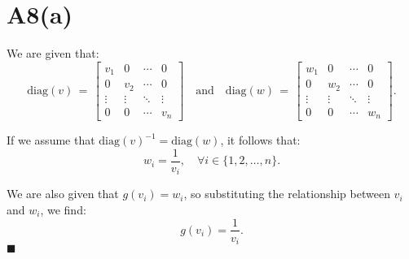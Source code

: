 \documentclass{article}
\begin{document}
\section*{A8(a)}

We are given that:
\[
\text{diag}(v) 
\,=\, 
\begin{bmatrix}
v_1 & 0 & \cdots & 0 \\
0 & v_2 & \cdots & 0 \\
\vdots & \vdots & \ddots & \vdots \\
0 & 0 & \cdots & v_n
\end{bmatrix}
\quad \text{and} \quad
\text{diag}(w) 
\,=\, 
\begin{bmatrix}
w_1 & 0 & \cdots & 0 \\
0 & w_2 & \cdots & 0 \\
\vdots & \vdots & \ddots & \vdots \\
0 & 0 & \cdots & w_n
\end{bmatrix}.
\]

If we assume that \( \text{diag}(v)^{-1} = \text{diag}(w) \), it follows that:
\[
w_i = \frac{1}{v_i}, \quad \forall i \in \{1, 2, \ldots, n\}.
\]

We are also given that \( g(v_i) = w_i \), so substituting the relationship between \( v_i \) and \( w_i \), we find:
\[
g(v_i) = \frac{1}{v_i}.
\]
\hfill\(\blacksquare\)
\end{document}
